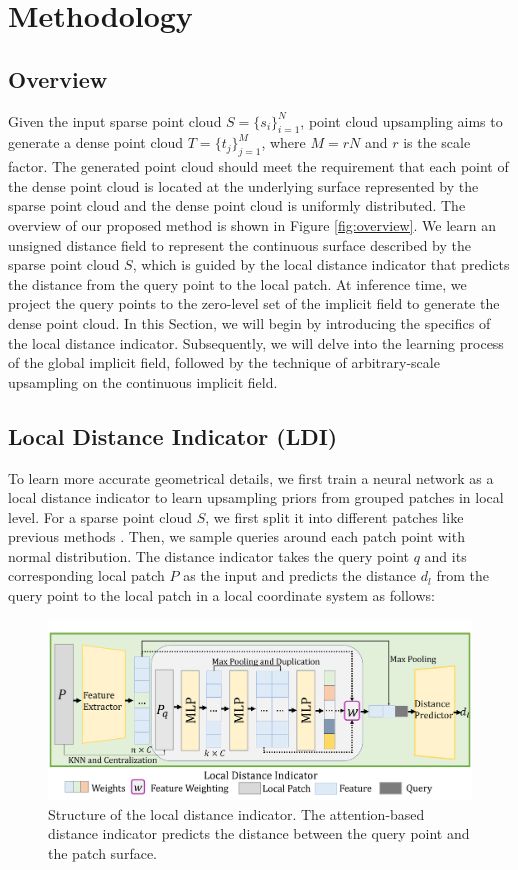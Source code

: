 \documentclass[letterpaper]{article} %
\begin{document}
\section{Methodology}
\subsection{Overview}
Given the input sparse point cloud $S=\{s_i\}^N_{i=1}$, point cloud upsampling aims to generate a dense point cloud $T=\{t_j\}_{j=1}^M$, where $M=rN$ and $r$ is the scale factor. The generated point cloud should meet the requirement that each point of the dense point cloud is located at the underlying surface represented by the sparse point cloud and the dense point cloud is uniformly distributed.
The overview of our proposed method is shown in Figure \ref{fig:overview}. We learn an unsigned distance field to represent the continuous surface described by the sparse point cloud $S$, which is guided by the local distance indicator that predicts the distance from the query point to the local patch. At inference time, we project the query points to the zero-level set of the implicit field to generate the dense point cloud. In this Section, we will begin by introducing the specifics of the local distance indicator. Subsequently, we will delve into the learning process of the global implicit field, followed by the technique of arbitrary-scale upsampling on the continuous implicit field.
\subsection{Local Distance Indicator (LDI)}

To learn more accurate geometrical details, we first train a neural network as a local distance indicator to learn upsampling priors from grouped patches in local level. For a sparse point cloud $S$, we first split it into different patches like previous methods \cite{long2022pc2, he2023grad}. Then, we sample queries around each patch point with normal distribution. The distance indicator takes the query point $q$ and its corresponding local patch $P$ as the input and predicts the distance $d_l$ from the query point to the local patch in a local coordinate system as follows:
\begin{figure}
\centering
\includegraphics[width=1.0\linewidth]{overview_part2.pdf}
\caption{Structure of the local distance indicator. The attention-based distance indicator predicts the distance between the query point and the patch surface.}
\label{fig:local_indicator}
\end{figure}
\end{document}
